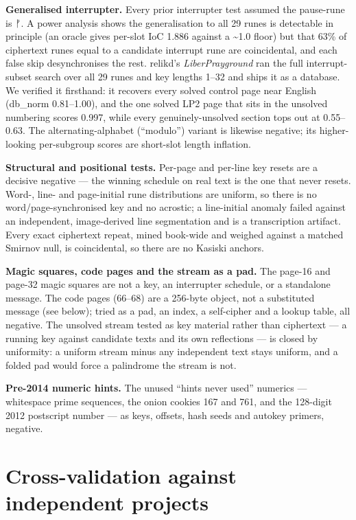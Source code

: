\documentclass[11pt]{article}
\begin{document}
\textbf{Generalised interrupter.} Every prior interrupter test assumed the pause-rune is ᚠ. A power analysis shows the generalisation to all 29 runes is detectable in principle (an oracle gives per-slot IoC 1.886 against a \textasciitilde{}1.0 floor) but that 63\% of ciphertext runes equal to a candidate interrupt rune are coincidental, and each false skip desynchronises the rest. relikd's \emph{LiberPrayground} ran the full interrupt-subset search over all 29 runes and key lengths 1–32 and ships it as a database. We verified it firsthand: it recovers every solved control page near English (db\_norm 0.81–1.00), and the one solved LP2 page that sits in the unsolved numbering scores 0.997, while every genuinely-unsolved section tops out at 0.55–0.63. The alternating-alphabet (``modulo'') variant is likewise negative; its higher-looking per-subgroup scores are short-slot length inflation.

\textbf{Structural and positional tests.} Per-page and per-line key resets are a decisive negative --- the winning schedule on real text is the one that never resets. Word-, line- and page-initial rune distributions are uniform, so there is no word/page-synchronised key and no acrostic; a line-initial anomaly failed against an independent, image-derived line segmentation and is a transcription artifact. Every exact ciphertext repeat, mined book-wide and weighed against a matched Smirnov null, is coincidental, so there are no Kasiski anchors.

\textbf{Magic squares, code pages and the stream as a pad.} The page-16 and page-32 magic squares are not a key, an interrupter schedule, or a standalone message. The code pages (66–68) are a 256-byte object, not a substituted message (see below); tried as a pad, an index, a self-cipher and a lookup table, all negative. The unsolved stream tested as key material rather than ciphertext --- a running key against candidate texts and its own reflections --- is closed by uniformity: a uniform stream minus any independent text stays uniform, and a folded pad would force a palindrome the stream is not.

\textbf{Pre-2014 numeric hints.} The unused ``hints never used'' numerics --- whitespace prime sequences, the onion cookies 167 and 761, and the 128-digit 2012 postscript number --- as keys, offsets, hash seeds and autokey primers, negative.

\section{Cross-validation against independent projects}
\end{document}
